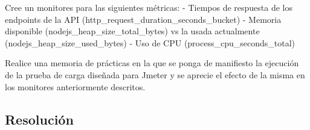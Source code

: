 Cree un monitores para las siguientes métricas: - Tiempos de respuesta
de los endpoints de la API (http\_request\_duration\_seconds\_bucket) -
Memoria disponible (nodejs\_heap\_size\_total\_bytes) vs la usada
actualmente (nodejs\_heap\_size\_used\_bytes) - Uso de CPU
(process\_cpu\_seconds\_total)

Realice una memoria de prácticas en la que se ponga de manifiesto la
ejecución de la prueba de carga diseñada para Jmeter y se aprecie el
efecto de la misma en los monitores anteriormente descritos.

\hypertarget{resoluciuxf3n-1}{%
\subsection{Resolución}\label{resoluciuxf3n-1}}



